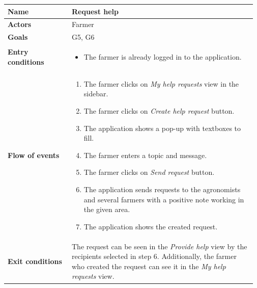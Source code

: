 \begin{table}[H]
    \centering
	\begin{tabular}{@{}p{0.25\linewidth} p{0.72\linewidth}@{}}
\toprule
		\textbf{Name}               & Request help\\
		\midrule
		\textbf{Actors}             & Farmer\\
		\midrule
		\textbf{Goals}              & G5, G6 \\
		\midrule
		
		\textbf{Entry conditions}   & \begin{itemize}[leftmargin=.4cm,noitemsep,topsep=0pt,before=\vspace{-3mm},after=\vspace{-4mm}]
		    \item The farmer is already logged in to the application.
		\end{itemize}\\
		\midrule
		
		\textbf{Flow of events}     & \begin{enumerate}[leftmargin=.4cm,noitemsep,topsep=0pt,before=\vspace{-3mm},after=\vspace{-4mm}]
		    \item The farmer clicks on \textit{My help requests} view in the sidebar.
		    \item The farmer clicks on \textit{Create help request} button.
		    \item The application shows a pop-up with textboxes to fill.
		    \item The farmer enters a topic and message.
		    \item The farmer clicks on \textit{Send request} button.
		    \item The application sends requests to the agronomists and several farmers with a positive note working in the given area. 
		    \item The application shows the created request.
		\end{enumerate}\\
		\midrule
		\textbf{Exit conditions}    & The request can be seen in the \textit{Provide help} view by the recipients selected in step 6. Additionally, the farmer who created the request can see it in the \textit{My help requests} view. \\
		\midrule
		

\end{tabular}
\end{table}

